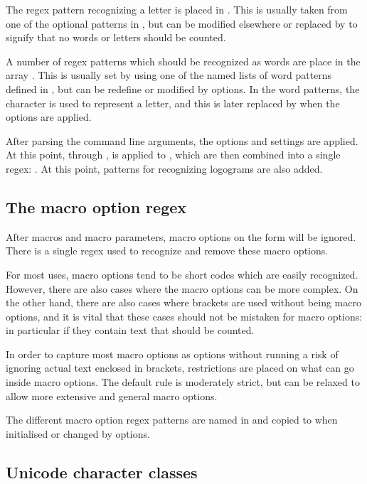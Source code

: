 \documentclass{article}
\begin{document}
The regex pattern recognizing a letter is placed in . This is usually taken from one of the optional patterns in , but can be modified elsewhere or replaced by  to signify that no words or letters should be counted.

A number of regex patterns which should be recognized as words are place in the array \code{\@WordPatterns}. This is usually set by using one of the named lists of word patterns defined in , but can be redefine or modified by options. In the word patterns, the character \code{\@} is used to represent a letter, and this is later replaced by  when the options are applied.

After parsing the command line arguments, the options and settings are applied. At this point, through ,  is applied to \code{\@WordPatterns}, which are then combined into a single regex: . At this point, patterns for recognizing logograms are also added.


\subsection{The macro option regex}

After macros and macro parameters, macro options on the form \code{[\ldots]} will be ignored. There is a single regex used to recognize and remove these macro options.

For most uses, macro options tend to be short codes which are easily recognized. However, there are also cases where the macro options can be more complex. On the other hand, there are also cases where brackets are used without being macro options, and it is vital that these cases should not be mistaken for macro options: in particular if they contain text that should be counted.

In order to capture most macro options as options without running a risk of ignoring actual text enclosed in brackets, restrictions are placed on what can go inside macro options. The default rule is moderately strict, but can be relaxed to allow more extensive and general macro options.

The different macro option regex patterns are named in  and copied to  when initialised or changed by options.


\subsection{Unicode character classes}
\end{document}
